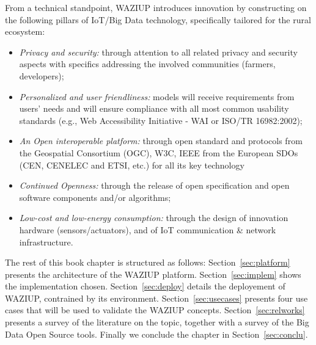 From a technical standpoint, WAZIUP introduces innovation by constructing on the following pillars of IoT/Big Data technology, specifically tailored for the rural ecosystem:
\begin{itemize}
  \item \emph{Privacy and security:} through attention to all related privacy and security aspects with specifics addressing the involved communities (farmers, developers);
  \item \emph{Personalized and user friendliness:} models will receive requirements from users’ needs and will ensure compliance with all most common usability standards (e.g., Web Accessibility Initiative - WAI or ISO/TR 16982:2002);
  \item \emph{An Open interoperable platform:} through open standard and protocols from the Geospatial Consortium (OGC), W3C, IEEE from the European SDOs (CEN, CENELEC and ETSI, etc.) for all its key technology
  \item \emph{Continued Openness:} through the release of open specification and open software components and/or algorithms;
  \item \emph{Low-cost and low-energy consumption:} through the design of innovation hardware (sensors/actuators), and of IoT communication \& network infrastructure.
\end{itemize}


The rest of this book chapter is structured as follows: Section~\ref{sec:platform} presents the architecture of the WAZIUP platform. 
Section~\ref{sec:implem} shows the implementation chosen. 
Section~\ref{sec:deploy} details the deployement of WAZIUP, contrained by its environment.
Section~\ref{sec:usecases} presents four use cases that will be used to validate the WAZIUP concepts.
Section~\ref{sec:relworks} presents a survey of the literature on the topic, together with a survey of the Big Data Open Source tools.
Finally we conclude the chapter in Section~\ref{sec:conclu}.
